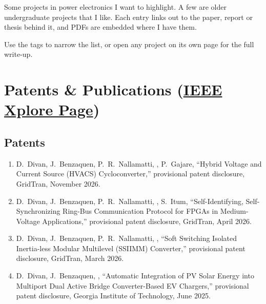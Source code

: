 %



Some projects in power electronics I want to highlight. A few are older
undergraduate projects that I like. Each entry links out to the paper, report or
thesis behind it, and PDFs are embedded where I have them.

Use the tags to narrow the list, or open any project on its own page for the
full write-up.

\section{Patents \& Publications
(\href{https://ieeexplore.ieee.org/author/854462305536516}{IEEE Xplore Page})}

\subsection{Patents}

\begin{enumerate}
  \item D.~Divan, J.~Benzaquen, P.~R.~Nallamatti, , P.~Gajare,
        ``Hybrid Voltage and Current Source (HVACS) Cycloconverter,''
        provisional patent disclosure, GridTran, November 2026.

  \item D.~Divan, J.~Benzaquen, P.~R.~Nallamatti, , S.~Itum,
        ``Self-Identifying, Self-Synchronizing Ring-Bus Communication Protocol
        for FPGAs in Medium-Voltage Applications,'' provisional patent
        disclosure, GridTran, April 2026.

  \item D.~Divan, J.~Benzaquen, P.~R.~Nallamatti, , ``Soft
        Switching Isolated Inertia-less Modular Multilevel (SSIIMM)
        Converter,'' provisional patent disclosure, GridTran, March 2026.

  \item D.~Divan, J.~Benzaquen, , ``Automatic Integration of PV
        Solar Energy into Multiport Dual Active Bridge Converter-Based EV
        Chargers,'' provisional patent disclosure, Georgia Institute of
        Technology, June 2025.
\end{enumerate}

